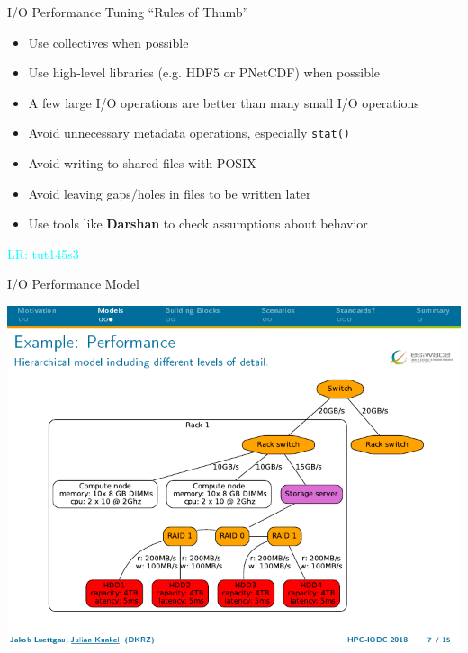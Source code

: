 \documentclass[compress,11pt,xcolor=svgnames,aspectratio=169]{beamer}
\newcommand{\lr}[1]{\textcolor{cyan}{LR: #1}}
\begin{document}
\begin{frame}[fragile]{I/O Performance Tuning ``Rules of Thumb''}

\begin{itemize}
\setlength\itemsep{0.3cm}

  \item Use collectives when possible

  \item Use high-level libraries (e.g. HDF5 or PNetCDF) when possible

  \item A few large I/O operations are better than many small I/O operations

  \item Avoid unnecessary metadata operations, especially \texttt{stat()}

  \item Avoid writing to shared files with POSIX

  \item Avoid leaving gaps/holes in files to be written later

  \item Use tools like \textbf{Darshan} to check assumptions about behavior

\end{itemize}

\lr{tut145s3}

\end{frame}

\begin{frame}[fragile]{I/O Performance Model}

\nocite{CAPMFESDMA19}

\begin{center}
\includegraphics[scale=0.7]{fig/bottleneck3}
\end{center}

\end{frame}
\end{document}
